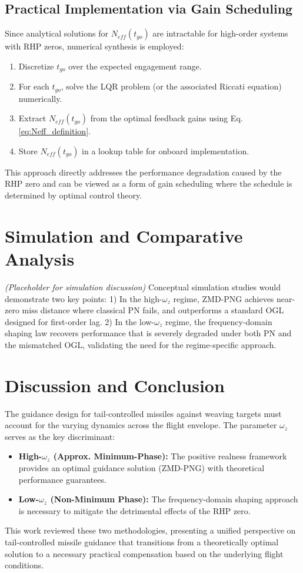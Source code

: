 \documentclass[11pt,a4paper]{article}
\begin{document}
\subsection{Practical Implementation via Gain Scheduling}
Since analytical solutions for $N_{eff}(t_{go})$ are intractable for high-order systems with RHP zeros, numerical synthesis is employed:
\begin{enumerate}
    \item Discretize $t_{go}$ over the expected engagement range.
    \item For each $t_{go}$, solve the LQR problem (or the associated Riccati equation) numerically.
    \item Extract $N_{eff}(t_{go})$ from the optimal feedback gains using Eq. \eqref{eq:Neff_definition}.
    \item Store $N_{eff}(t_{go})$ in a lookup table for onboard implementation.
\end{enumerate}

This approach directly addresses the performance degradation caused by the RHP zero and can be viewed as a form of gain scheduling where the schedule is determined by optimal control theory.

\section{Simulation and Comparative Analysis}
\label{sec:simulation}
\textit{(Placeholder for simulation discussion)} Conceptual simulation studies would demonstrate two key points: 1) In the high-$\omega_z$ regime, ZMD-PNG achieves near-zero miss distance where classical PN fails, and outperforms a standard OGL designed for first-order lag. 2) In the low-$\omega_z$ regime, the frequency-domain shaping law recovers performance that is severely degraded under both PN and the mismatched OGL, validating the need for the regime-specific approach.

\section{Discussion and Conclusion}
The guidance design for tail-controlled missiles against weaving targets must account for the varying dynamics across the flight envelope. The parameter $\omega_z$ serves as the key discriminant:
\begin{itemize}
    \item \textbf{High-$\omega_z$ (Approx. Minimum-Phase):} The positive realness framework provides an optimal guidance solution (ZMD-PNG) with theoretical performance guarantees.
    \item \textbf{Low-$\omega_z$ (Non-Minimum Phase):} The frequency-domain shaping approach is necessary to mitigate the detrimental effects of the RHP zero.
\end{itemize}
This work reviewed these two methodologies, presenting a unified perspective on tail-controlled missile guidance that transitions from a theoretically optimal solution to a necessary practical compensation based on the underlying flight conditions.
\end{document}
